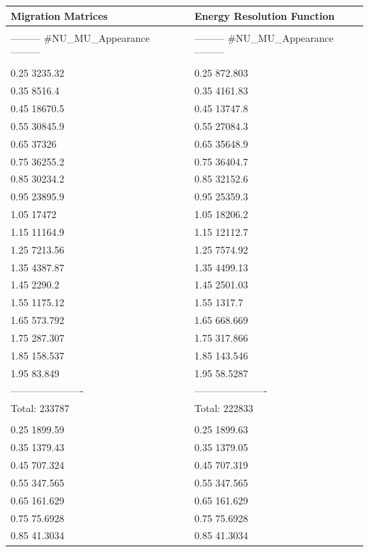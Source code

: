 \documentclass[12pt,a4paper]{article}
\theoremstyle{dotless}
\begin{document}
\begin{appendix}
\begin {center}
\begin{tabular}{lcl}
{\large Migration Matrices} && {\large Energy Resolution Function} \\ \hline && \\ 
--------- \#NU\_MU\_Appearance ---------&&--------- \#NU\_MU\_Appearance ---------\\
&&\\
  0.25       3235.32&&  0.25       872.803\\
  0.35        8516.4&&  0.35       4161.83\\
  0.45       18670.5&&  0.45       13747.8\\
  0.55       30845.9&&  0.55       27084.3\\
  0.65         37326&&  0.65       35648.9\\
  0.75       36255.2&&  0.75       36404.7\\
  0.85       30234.2&&  0.85       32152.6\\
  0.95       23895.9&&  0.95       25359.3\\
  1.05         17472&&  1.05       18206.2\\
  1.15       11164.9&&  1.15       12112.7\\
  1.25       7213.56&&  1.25       7574.92\\
  1.35       4387.87&&  1.35       4499.13\\
  1.45        2290.2&&  1.45       2501.03\\
  1.55       1175.12&&  1.55        1317.7\\
  1.65       573.792&&  1.65       668.669\\
  1.75       287.307&&  1.75       317.866\\
  1.85       158.537&&  1.85       143.546\\
  1.95        83.849&&  1.95       58.5287\\
----------------------&&----------------------\\
Total:        233787&&Total:        222833\\
&&\\
  0.25       1899.59&&  0.25       1899.63\\
  0.35       1379.43&&  0.35       1379.05\\
  0.45       707.324&&  0.45       707.319\\
  0.55       347.565&&  0.55       347.565\\
  0.65       161.629&&  0.65       161.629\\
  0.75       75.6928&&  0.75       75.6928\\
  0.85       41.3034&&  0.85       41.3034\\

\end{tabular}
\end{center}
\end{appendix}
\end{document}
